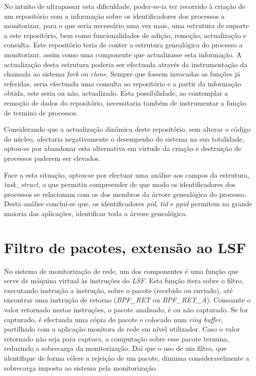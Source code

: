 No intuito de ultrapassar esta dificuldade, poder-se-ia ter recorrido à criação de um repositório com a informação sobre os identificadores dos processos a monitorizar, para o que seria necessário uma vez mais, uma estrutura de suporte a este repositório, bem como funcionalidades de adição, remoção, actualização e consulta.
Este repositório teria de conter a estrutura genealógica do processo a monitorizar, assim como uma componente que actualizasse esta informação.
A actualização desta estrutura poderia ser efectuada através da instrumentação da chamada ao sistema \textit{fork} ou \textit{clone}.
Sempre que fossem invocadas as funções já referidas, seria efectuada uma consulta ao repositório e a partir da informação obtida, este seria ou não, actualizado.
Esta possibilidade, ao contemplar a remoção de dados do repositório, necessitaria também de instrumentar a função de termino de processos.

Considerando que a actualização dinâmica deste repositório, sem alterar o código do núcleo, afectaria negativamente o desempenho do sistema na sua totalidade, optou-se por abandonar esta alternativa em virtude da criação e destruição de processos puderem ser elevados.


Face a esta situação, optou-se por efectuar uma análise aos campos da estrutura, \textit{task\_struct}, o que permitiu compreender de que modo os identificadores dos processos se relacionam com os dos membros da árvore genealógica do processo.
Desta análise concluí-se que, os identificadores \textit{pid}, \textit{tid} e \textit{ppid} permitem na grande maioria das aplicações, identificar toda a árvore genealógica.




\section{Filtro de pacotes, extensão ao LSF}

No sistema de monitorização de rede, um dos componentes é uma função que serve de máquina virtual às instruções do \textit{LSF}.
Esta função itera sobre o filtro, executando instrução a instrução, sobre o pacote (recebido ou enviado), até encontrar uma instrução de retorno (\textit{BPF\_RET} ou \textit{BPF\_RET\_A}).
Consoante o valor retornado nestas instruções, o pacote analisado, é ou não capturado.
Se for capturado, é efectuada uma cópia do pacote e colocado num \textit{ring buffer}, partilhado com a aplicação monitora de rede em nível utilizador.
Caso o valor retornado não seja para captura, a computação sobre esse pacote termina, reduzindo a sobrecarga da monitorização.
Daí que o uso de um filtro, que identifique de forma célere a rejeição de um pacote, diminua consideravelmente a sobrecarga imposta ao sistema pela monitorização.

